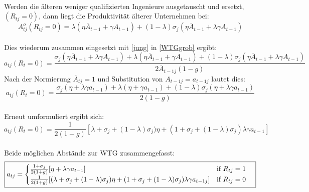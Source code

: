 \\
Werden die älteren weniger qualifizierten Ingenieure ausgetauscht und ersetzt, $(R_{tj}=0)$, dann liegt die Produktivität älterer Unternehmen bei: 
\begin{equation}
A_{tj}^o(R_{tj}=0)=\lambda(\eta\overline{A}_{t-1}+\gamma A_{t-1})+(1-\lambda)\sigma_j(\eta\overline{A}_{t-1}+\lambda\gamma A_{t-1})\label{austausch}
\end{equation}
\\
Dies wiederum zusammen eingesetzt mit \eqref{jung} in \eqref{WTGgrob} ergibt:
\begin{equation}
a_{tj}(R_{t}=0)=\frac{\sigma_j(\eta\overline{A}_{t-1}+\lambda\gamma A_{t-1})+\lambda(\eta\overline{A}_{t-1}+\gamma A_{t-1})+(1-\lambda)\sigma_j(\eta\overline{A}_{t-1}+\lambda\gamma A_{t-1})}{2\overline{A}_{t-1j}(1-g)}
\end{equation}
Nach der Normierung $\overline{A}_{tj}=1$ und Substitution von $A_{t-1j}=a_{t-1j}$ lautet dies:
\begin{equation}
a_{tj}(R_{t}=0)=\frac{\sigma_j(\eta+\lambda\gamma a_{t-1})+\lambda(\eta+\gamma a_{t-1})+(1-\lambda)\sigma_j(\eta+\lambda\gamma a_{t-1})}{2(1-g)}
\end{equation}
\\
Erneut umformuliert ergibt sich: 
\begin{equation}
\boxed{a_{tj}(R_{t}=0)=\frac{1}{2(1-g)}\left[\lambda+\sigma_j+(1-\lambda)\sigma_j)\eta+(1+\sigma_j+(1-\lambda)\sigma_j)\lambda\gamma a_{t-1}\right]}
\end{equation}
\\
Beide möglichen Abstände zur WTG zusammengefasst:
\begin{equation}
\boxed{
a_{tj}=\begin{cases}\frac{1+\sigma_j}{2(1+g)}[\eta+\lambda \gamma a_{t-1}] \hfill\text{if  } R_{tj}=1 \\
\frac{1}{2(1+g)}[(\lambda+\sigma_j+(1-\lambda)\sigma_j)\eta+(1+\sigma_j+(1-\lambda)\sigma_j)\lambda\gamma a_{t-1 j}] \quad\hfill\text{if   }R_{tj}=0
\end{cases}}
\end{equation}


